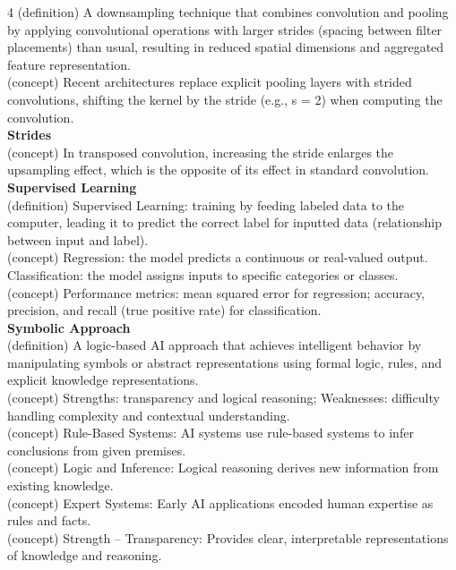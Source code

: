 \documentclass[8pt]{extarticle}
\begin{document}
\begin{multicols}{4}
{(definition) A downsampling technique that combines convolution and pooling by applying convolutional operations with larger strides (spacing between filter placements) than usual, resulting in reduced spatial dimensions and aggregated feature representation.\\
(concept) Recent architectures replace explicit pooling layers with strided convolutions, shifting the kernel by the stride (e.g., s = 2) when computing the convolution.\\
\vspace{2pt}\textbf{Strides}\\
(concept) In transposed convolution, increasing the stride enlarges the upsampling effect, which is the opposite of its effect in standard convolution.\\
\vspace{2pt}\textbf{Supervised Learning}\\
(definition) Supervised Learning: training by feeding labeled data to the computer, leading it to predict the correct label for inputted data (relationship between input and label).\\
(concept) Regression: the model predicts a continuous or real-valued output. Classification: the model assigns inputs to specific categories or classes.\\
(concept) Performance metrics: mean squared error for regression; accuracy, precision, and recall (true positive rate) for classification.\\
\vspace{2pt}\textbf{Symbolic Approach}\\
(definition) A logic-based AI approach that achieves intelligent behavior by manipulating symbols or abstract representations using formal logic, rules, and explicit knowledge representations.\\
(concept) Strengths: transparency and logical reasoning; Weaknesses: difficulty handling complexity and contextual understanding.\\
(concept) Rule-Based Systems: AI systems use rule-based systems to infer conclusions from given premises.\\
(concept) Logic and Inference: Logical reasoning derives new information from existing knowledge.\\
(concept) Expert Systems: Early AI applications encoded human expertise as rules and facts.\\
(concept) Strength -- Transparency: Provides clear, interpretable representations of knowledge and reasoning.\\
}
\end{multicols}
\end{document}
